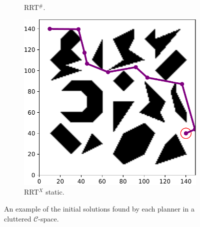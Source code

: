 \documentclass{ctuthesis}
\begin{document}
\begin{figure}[!ht]
\begin{subfigure}[b]{0.32\textwidth}
    \caption{RRT$^\#$.}
  \end{subfigure}  
  \begin{subfigure}[b]{0.32\textwidth}
    \includegraphics[width=\textwidth]{figChap5/Maze_clutter_first_solution_RRTXstatic.pdf}  
    \caption{RRT$^X$ static.}
  \end{subfigure}   
  \caption{An example of the initial solutions found by each planner 
  in a cluttered $\mathcal{C}$-space.}
  \label{fig:first_sol_clutter}
\end{figure}
\end{document}
